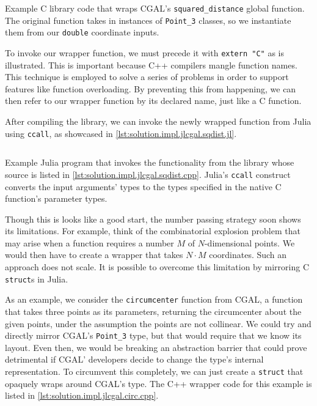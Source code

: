 \begin{listing}[htb]
  \inputminted{cpp}{cpp/sqdist.cpp}
  \caption[C wrapper for squared distance functionality]{
    Example C library code that wraps \ac{CGAL}'s \texttt{squared\_distance}
    global function.  The original function takes in instances of
    \texttt{Point\_3} classes, so we instantiate them from our
    \texttt{double} coordinate inputs.}%
  \label{lst:solution.impl.jlcgal.sqdist.cpp}
\end{listing}

To invoke our wrapper function, we must precede it with \texttt{extern
"C"} as is illustrated.  This is important because C++ compilers mangle function
names.  This technique is employed to solve a series of problems in order to
support features like function overloading. By preventing this from happening,
we can then refer to our wrapper function by its declared name, just like a C
function.

After compiling the library, we can invoke the newly wrapped function from Julia
using \texttt{ccall}, as showcased in
\cref{lst:solution.impl.jlcgal.sqdist.jl}.

\begin{listing}[htb]
  \inputminted{julia}{jl/sqdist.jl}
  \caption[Julia squared distance example program]{
    Example Julia program that invokes the functionality from the library whose
    source is listed in \cref{lst:solution.impl.jlcgal.sqdist.cpp}.  Julia's
    \texttt{ccall} construct converts the input arguments' types to
    the types specified in the native C function's parameter types.}%
  \label{lst:solution.impl.jlcgal.sqdist.jl}
\end{listing}

Though this is looks like a good start, the number passing strategy soon shows
its limitations. For example, think of the combinatorial explosion problem that
may arise when a function requires a number $M$ of $N$-dimensional points.  We
would then have to create a wrapper that takes $N\cdot M$ coordinates.  Such an
approach does not scale.  It is possible to overcome this limitation by
mirroring C \texttt{struct}s in Julia.

As an example, we consider the \texttt{circumcenter} function from \ac{CGAL}, a
function that takes three points as its parameters, returning the circumcenter
about the given points, under the assumption the points are not collinear.  We
could try and directly mirror \ac{CGAL}'s \texttt{Point\_3} type, but that would
require that we know its layout.  Even then, we would be breaking an abstraction
barrier that could prove detrimental if \ac{CGAL}' developers decide to change
the type's internal representation.  To circumvent this completely, we can just
create a \texttt{struct} that opaquely wraps around \ac{CGAL}'s type.
The C++ wrapper code for this example is listed in
\cref{lst:solution.impl.jlcgal.circ.cpp}.

